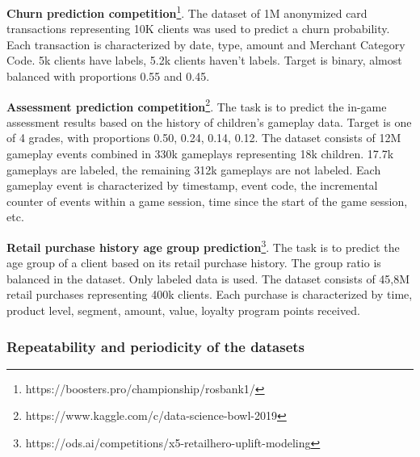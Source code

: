 \documentclass[sigconf, anonymous]{acmart}
\begin{document}
\textbf{Churn prediction competition}\footnote{https://boosters.pro/championship/rosbank1/}. The dataset of 1M an\-onymiz\-ed card transactions representing 10K clients was used to predict a churn probability. Each transaction is characterized by date, type, amount and Merchant Category Code. 5k clients have labels, 5.2k clients haven't labels. Target is binary, almost balanced with proportions 0.55 and 0.45.

\textbf{Assessment prediction competition}\footnote{https://www.kaggle.com/c/data-science-bowl-2019}.  The task is to predict the in-game assessment results based on the history of children's gameplay data. Target is one of 4 grades, with proportions 0.50, 0.24, 0.14, 0.12. The dataset consists of 12M gameplay events combined in 330k gameplays representing 18k children. 17.7k gameplays are labeled, the remaining 312k gameplays are not labeled. Each gameplay event is characterized by timestamp, event code, the incremental counter of events within a game session, time since the start of the game session, etc.

\textbf{Retail purchase history age group prediction}\footnote{https://ods.ai/competitions/x5-retailhero-uplift-modeling}. The task is to predict the age group of a client based on its retail purchase history. The group ratio is balanced in the dataset. Only labeled data is used. The dataset consists of 45,8M retail purchases representing 400k clients. Each purchase is characterized by time, product level, segment, amount, value, loyalty program points received.



\subsubsection{Repeatability and periodicity of the datasets} \label{sec-period}
\end{document}
